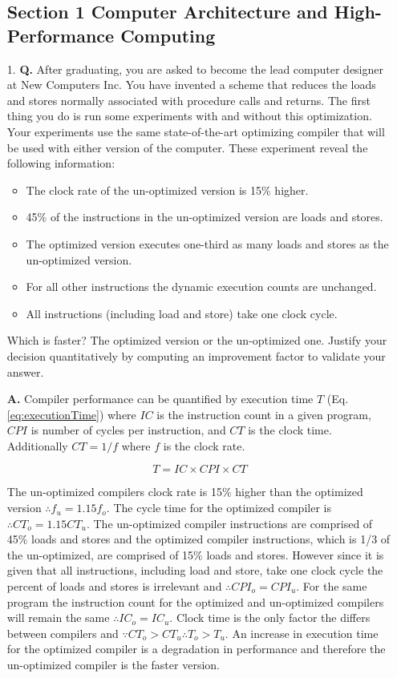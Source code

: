 \documentclass[main.tex]{subfiles}
\begin{document}
\begin{enumerate}

\subsection*{Section 1 Computer Architecture and High-Performance Computing}

\item [1.] \textbf{Q.} After graduating, you are asked to become the lead computer designer at New Computers Inc. You have invented a scheme that reduces the loads and stores normally associated with procedure calls and returns. The first thing you do is run some experiments with and without this optimization. Your experiments use the same state-of-the-art optimizing compiler that will be used with either version of the computer. These experiment reveal the following information:
\begin{itemize}
    \item The clock rate of the un-optimized version is 15\% higher.
    \item 45\% of the instructions in the un-optimized version are loads and stores.
    \item The optimized version executes one-third as many loads and stores as the un-optimized version.
    \item For all other instructions the dynamic execution counts are unchanged.
    \item All instructions (including load and store) take one clock cycle.
\end{itemize}
Which is faster? The optimized version or the un-optimized one. Justify your decision quantitatively by computing an improvement factor to validate your answer. 

\textbf{A.} Compiler performance can be quantified by execution time $T$ (Eq. \ref{eq:executionTime}) where $IC$ is the instruction count in a given program, $CPI$ is number of cycles per instruction, and $CT$ is the clock time. Additionally $CT=1/f$ where $f$ is the clock rate.

\begin{equation} \label{eq:executionTime}
T = IC \times CPI \times CT
\end{equation}

The un-optimized compilers clock rate is 15\% higher than the optimized version $\therefore f_{u} = 1.15f_{o}$. The cycle time for the optimized compiler is $\therefore CT_o = 1.15CT_u$. The un-optimized compiler instructions are comprised of 45\% loads and stores and the optimized compiler instructions, which is 1/3 of the un-optimized, are comprised of 15\% loads and stores. However since it is given that all instructions, including load and store, take one clock cycle the percent of loads and stores is irrelevant and $\therefore CPI_o = CPI_u$. For the same program the instruction count for the optimized and un-optimized compilers will remain the same $\therefore IC_o = IC_u$. Clock time is the only factor the differs between compilers and $\because CT_o > CT_u \therefore T_o > T_u$. An increase in execution time for the optimized compiler is a degradation in performance and therefore the un-optimized compiler is the faster version.


\end{enumerate}
\end{document}
